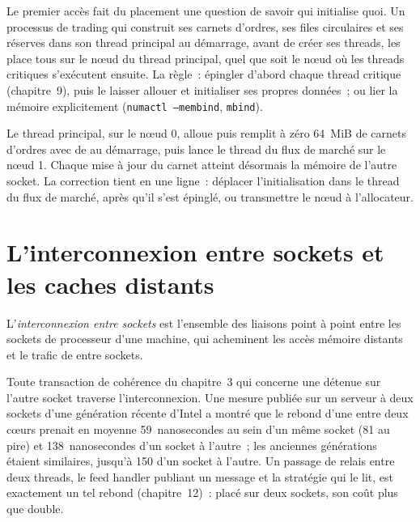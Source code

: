 Le premier accès fait du placement une question de savoir qui initialise quoi. Un processus de trading qui construit ses carnets d'ordres, ses files
circulaires et ses réserves dans son thread principal au démarrage, avant de créer ses threads, les place tous sur le nœud du thread principal,
quel que soit le nœud où les threads critiques s'exécutent ensuite. La règle~: épingler d'abord chaque thread critique (chapitre~9), puis le laisser allouer et initialiser
ses propres données~; ou lier la mémoire explicitement (\texttt{numactl --membind}, \texttt{mbind}).

\begin{example}\label{ex:ll:multi-socket-machines-and-interconnects:touch}
Le thread principal, sur le nœud 0, alloue puis remplit à zéro 64~MiB de carnets d'ordres avec de  au démarrage, puis lance le
thread du flux de marché sur le nœud 1. Chaque mise à jour du carnet atteint désormais la mémoire de l'autre socket. La correction tient en une ligne~: déplacer
l'initialisation dans le thread du flux de marché, après qu'il s'est épinglé, ou transmettre le nœud à l'allocateur.
\end{example}

\section{L'interconnexion entre sockets et les caches distants}

\begin{definition}\label{def:ll:multi-socket-machines-and-interconnects:link}
L'\emph{interconnexion entre sockets} est l'ensemble des liaisons point à point entre les sockets de processeur
d'une machine, qui acheminent les accès mémoire distants et le trafic de  entre sockets.
\end{definition}

Toute transaction de cohérence du chapitre~3 qui concerne une  détenue sur l'autre socket traverse l'interconnexion. Une
mesure publiée sur un serveur à deux sockets d'une génération récente d'Intel a montré que le rebond d'une  entre deux
cœurs prenait en moyenne 59~nanosecondes au sein d'un même socket (81 au pire) et 138~nanosecondes d'un socket à l'autre~; les
anciennes générations étaient similaires, jusqu'à 150 d'un socket à l'autre. Un passage de relais entre deux threads, le feed handler publiant un message et
la stratégie qui le lit, est exactement un tel rebond (chapitre~12)~: placé sur deux sockets, son coût plus que double.

